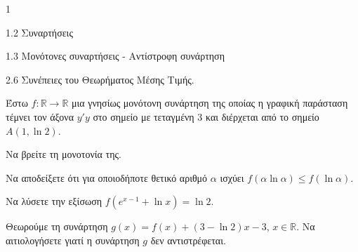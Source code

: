 \begin{ylh}{1}
    \item 1.2 Συναρτήσεις
    \item 1.3 Μονότονες συναρτήσεις - Αντίστροφη συνάρτηση
    \item 2.6 Συνέπειες του Θεωρήματος Μέσης Τιμής.
\end{ylh}
Έστω $f:\mathbb{R}\to\mathbb{R}$ μια γνησίως μονότονη συνάρτηση της οποίας η γραφική παράσταση τέμνει τον άξονα $y'y$ στο σημείο με τεταγμένη 3 και διέρχεται από το σημείο $A(1, \ln2)$.
\begin{alist}
\item Να βρείτε τη μονοτονία της. 
\item Να αποδείξετε ότι για οποιοδήποτε θετικό αριθμό $\alpha$ ισχύει $f(\alpha\ln\alpha) \le f(\ln\alpha)$. 
\item Να λύσετε την εξίσωση $f(e^{x-1}+\ln x)=\ln2$. 
\item Θεωρούμε τη συνάρτηση $g(x)=f(x)+(3-\ln2)x-3$, $x\in\mathbb{R}$. Να αιτιολογήσετε γιατί η συνάρτηση $g$ δεν αντιστρέφεται. 
\end{alist}